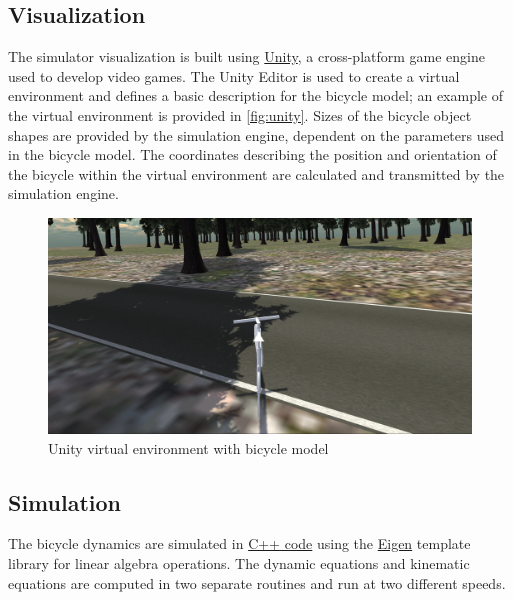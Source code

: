 \documentclass[11pt,a4paper,reqno]{amsart}
\begin{document}
\subsection{Visualization}
The simulator visualization is built using \href{https://unity3d.com/}{Unity}, a cross-platform game engine used to
develop video games.
The Unity Editor is used to create a virtual environment and defines a basic description for the bicycle model;
an example of the virtual environment is provided in \autoref{fig:unity}.
Sizes of the bicycle object shapes are provided by the simulation engine, dependent on the parameters used in the
bicycle model.
The coordinates describing the position and orientation of the bicycle within the virtual environment are calculated and
transmitted by the simulation engine.

\begin{figure}
    \centering
    \includegraphics[width=\textwidth]{screenshot_2015-06-27_19-31-15.png}
    \caption{Unity virtual environment with bicycle model}
    \label{fig:unity}
\end{figure}

\subsection{Simulation}
The bicycle dynamics are simulated in \href{https://github.com/oliverlee/bicycle}{C++ code} using the
\href{http://eigen.tuxfamily.org/index.php?title=Main_Page}{Eigen}\cite{eigenweb} template library for linear algebra
operations.
The dynamic equations and kinematic equations are computed in two separate routines and run at two different speeds.
\end{document}

